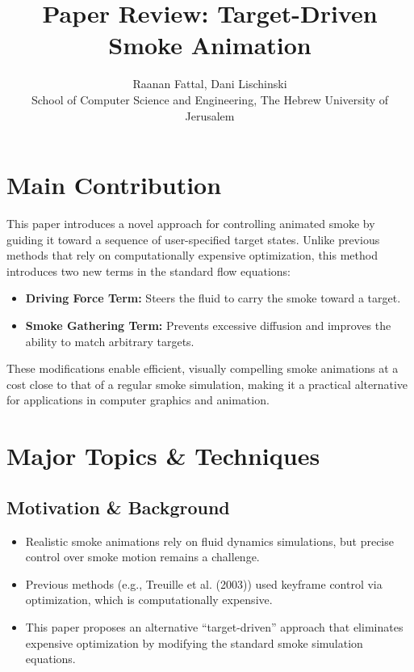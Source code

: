 \documentclass[11pt]{article}
\title{Paper Review: Target-Driven Smoke Animation}
\author{Raanan Fattal, Dani Lischinski \\ School of Computer Science and Engineering, The Hebrew University of Jerusalem}
\date{}
\begin{document}
\maketitle

\section{Main Contribution}
This paper introduces a novel approach for controlling animated smoke by guiding it toward a sequence of user-specified target states. Unlike previous methods that rely on computationally expensive optimization, this method introduces two new terms in the standard flow equations:
\begin{itemize}
    \item \textbf{Driving Force Term:} Steers the fluid to carry the smoke toward a target.
    \item \textbf{Smoke Gathering Term:} Prevents excessive diffusion and improves the ability to match arbitrary targets.
\end{itemize}
These modifications enable efficient, visually compelling smoke animations at a cost close to that of a regular smoke simulation, making it a practical alternative for applications in computer graphics and animation.

\section{Major Topics \& Techniques}
\subsection{Motivation \& Background}
\begin{itemize}
    \item Realistic smoke animations rely on fluid dynamics simulations, but precise control over smoke motion remains a challenge.
    \item Previous methods (e.g., Treuille et al. (2003)) used keyframe control via optimization, which is computationally expensive.
    \item This paper proposes an alternative ``target-driven'' approach that eliminates expensive optimization by modifying the standard smoke simulation equations.
\end{itemize}
\end{document}
